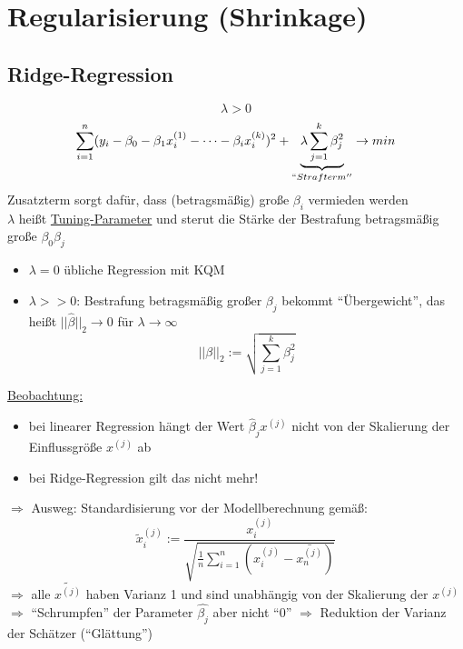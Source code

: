 \section{Regularisierung (Shrinkage)}
\subsection{Ridge-Regression}
\[ \lambda > 0 \]
\[ \sum\limits_{i=1}^{n} (y_i - \beta_0 - \beta_1 x_i^{(1)} - \dots - \beta_i x_i^{(k)})^2 + \underbrace{\lambda \sum\limits_{j=1}^{k} \beta_j^{2}}_{``Strafterm''} \rightarrow min \]
	Zusatzterm sorgt dafür, dass (betragsmäßig) große $\beta_i$ vermieden werden \\
	$\lambda$ heißt \underline{Tuning-Parameter} und sterut die Stärke der Bestrafung betragsmäßig große $\beta_0 \beta_j$
	\begin{itemize}
		\item $\lambda=0$ übliche Regression mit KQM
		\item $\lambda >>0$: Bestrafung betragsmäßig großer $\beta_j$ bekommt ``Übergewicht'', das heißt $||\hat{\beta}||_2 \rightarrow 0 $ für $\lambda \rightarrow \infty $
			\[ ||\beta ||_2 := \sqrt{\sum\limits_{j=1}^{k}\beta_j^{2}} \]
	\end{itemize}
	\underline{Beobachtung:}
	\begin{itemize}
		\item bei linearer Regression hängt der Wert $\hat{\beta}_j x^{(j)}$ nicht von der Skalierung der Einflussgröße $x^{(j)}$ ab
		\item bei Ridge-Regression gilt das nicht mehr!
	\end{itemize}
$\Rightarrow$ Ausweg: Standardisierung vor der Modellberechnung gemäß:
\[ \tilde{x}_i^{(j)} := \frac{x_i^{(j)}}{\sqrt{\frac{1}{n}\sum\limits_{i=1}^{n}(x_i^{(j)} - \bar{x^{(j)}_n})}} \]
$\Rightarrow $ alle $\tilde{x^{(j)}}$ haben Varianz 1 und sind unabhängig von der Skalierung der $x^{(j)}$
$\Rightarrow$ ``Schrumpfen'' der Parameter $\hat{\beta_j}$ aber nicht ``0''
$\Rightarrow$ Reduktion der Varianz der Schätzer (``Glättung'')
